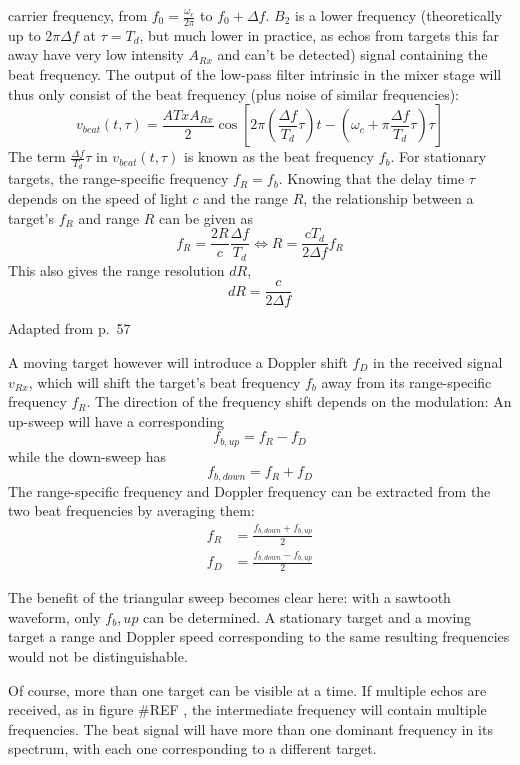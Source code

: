 carrier frequency, from \(f_0 = \frac{\omega_c}{2\pi}\) to
\(f_0 + \Delta f\). \(B_2\) is a lower frequency (theoretically up to
\(2\pi\Delta f\) at \(\tau = T_d\), but much lower in practice, as echos
from targets this far away have very low intensity \(A_{Rx}\) and can't
be detected) signal containing the beat frequency. The output of the
low-pass filter intrinsic in the mixer stage will thus only consist of
the beat frequency (plus noise of similar frequencies): \[
v_{beat}(t,\tau) = \frac{A{Tx}A_{Rx}}{2} \cos \left[ 2\pi\left(\frac{\Delta f}{T_d}\tau\right)t - \left(\omega_c + \pi\frac{\Delta f}{T_d}\tau \right) \tau \right]
\] The term \(\frac{\Delta f}{T_d}\tau\) in \(v_{beat}(t,\tau)\) is
known as the beat frequency \(f_b\). For stationary targets, the
range-specific frequency \(f_R = f_b\). Knowing that the delay time
\(\tau\) depends on the speed of light \(c\) and the range \(R\), the
relationship between a target's \(f_R\) and range \(R\) can be given as
\[
f_R = \frac{2R}{c} \frac{\Delta f}{T_d} \iff R=\frac{c T_d}{2\Delta f}f_R
\] This also gives the range resolution \(dR\), \[
dR = \frac{c}{2 \Delta f}
\]

%
Adapted from \cite{Adams2012} p.~57

A moving target however will introduce a Doppler shift \(f_D\) in the
received signal \(v_{Rx}\), which will shift the target's beat frequency
\(f_b\) away from its range-specific frequency \(f_R\). The direction of
the frequency shift depends on the modulation: An up-sweep will have a
corresponding \[f_{b,up} = f_R - f_D\] while the down-sweep has
\[f_{b,down} = f_R + f_D\] The range-specific frequency and Doppler
frequency can be extracted from the two beat frequencies by averaging
them: \[
\begin{aligned}
f_R &= \frac{f_{b,down} + f_{b,up}}{2} \\
f_D &= \frac{f_{b,down} - f_{b,up}}{2}
\end{aligned}
\]

The benefit of the triangular sweep becomes clear here: with a sawtooth
waveform, only \(f_b,up\) can be determined. A stationary target and a
moving target a range and Doppler speed corresponding to the same
resulting frequencies would not be distinguishable.

Of course, more than one target can be visible at a time. If multiple
echos are received, as in figure \#REF , the intermediate frequency will
contain multiple frequencies. The beat signal will have more than one
dominant frequency in its spectrum, with each one corresponding to a
different target.


